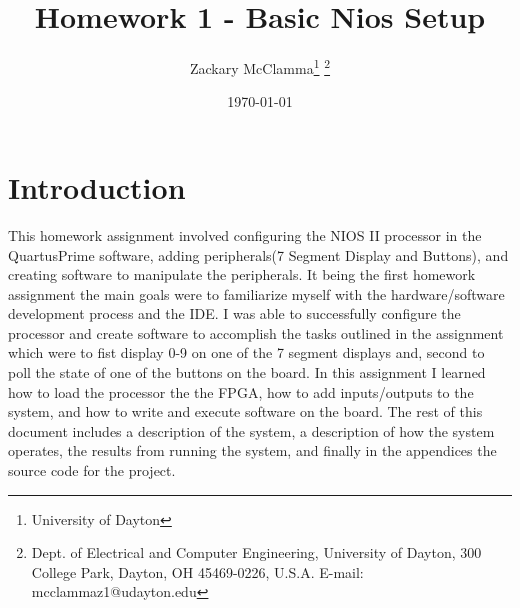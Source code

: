 \documentclass[10pt,a4paper]{article}
\begin{document}
	\title{Homework 1 - Basic Nios Setup}
	\makeatletter
	
	\author{Zackary McClamma\thanks{University of Dayton}
		\thanks{Dept. of Electrical and Computer
			Engineering, University of Dayton, 300 College Park, Dayton, OH
			45469-0226, U.S.A. E-mail:
			mcclammaz1@udayton.edu}}
	
	\makeatother
	
	\date{\today}
	
	\maketitle
	
	\section{Introduction}
	This homework assignment involved configuring the NIOS II processor in the QuartusPrime software, adding peripherals(7 Segment Display and Buttons), and creating software to manipulate the peripherals. It being the first homework assignment the main goals were to familiarize myself with the hardware/software development process and the IDE. I was able to successfully configure the processor and create software to accomplish the tasks outlined in the assignment which were to fist display 0-9 on one of the 7 segment displays and, second to poll the state of one of the buttons on the board. In this assignment I learned how to load the processor the the FPGA, how to add inputs/outputs to the system, and how to write and execute software on the board. The rest of this document includes a description of the system, a description of how the system operates, the results from running the system, and finally in the appendices the source code for the project.
\end{document}
